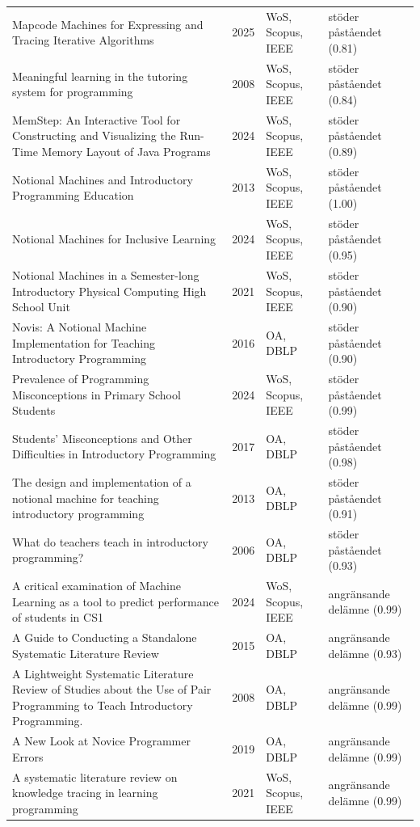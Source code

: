 \begin{longtable}{@{}%
  >{\raggedright\arraybackslash}p{}c%
  >{\raggedright\arraybackslash}p{}%
  >{\raggedright\arraybackslash}p{}@{}}
Mapcode Machines for Expressing and Tracing Iterative Algorithms & 2025 & WoS, Scopus, IEEE & stöder påståendet (0.81) \\
Meaningful learning in the tutoring system for programming & 2008 & WoS, Scopus, IEEE & stöder påståendet (0.84) \\
MemStep: An Interactive Tool for Constructing and Visualizing the Run-Time Memory Layout of Java Programs & 2024 & WoS, Scopus, IEEE & stöder påståendet (0.89) \\
Notional Machines and Introductory Programming Education & 2013 & WoS, Scopus, IEEE & stöder påståendet (1.00) \\
Notional Machines for Inclusive Learning & 2024 & WoS, Scopus, IEEE & stöder påståendet (0.95) \\
Notional Machines in a Semester-long Introductory Physical Computing High School Unit & 2021 & WoS, Scopus, IEEE & stöder påståendet (0.90) \\
Novis: A Notional Machine Implementation for Teaching Introductory Programming & 2016 & OA, DBLP & stöder påståendet (0.90) \\
Prevalence of Programming Misconceptions in Primary School Students & 2024 & WoS, Scopus, IEEE & stöder påståendet (0.99) \\
Students' Misconceptions and Other Difficulties in Introductory Programming & 2017 & OA, DBLP & stöder påståendet (0.98) \\
The design and implementation of a notional machine for teaching introductory programming & 2013 & OA, DBLP & stöder påståendet (0.91) \\
What do teachers teach in introductory programming? & 2006 & OA, DBLP & stöder påståendet (0.93) \\
A critical examination of Machine Learning as a tool to predict performance of students in CS1 & 2024 & WoS, Scopus, IEEE & angränsande delämne (0.99) \\
A Guide to Conducting a Standalone Systematic Literature Review & 2015 & OA, DBLP & angränsande delämne (0.93) \\
A Lightweight Systematic Literature Review of Studies about the Use of Pair Programming to Teach Introductory Programming. & 2008 & OA, DBLP & angränsande delämne (0.99) \\
A New Look at Novice Programmer Errors & 2019 & OA, DBLP & angränsande delämne (0.99) \\
A systematic literature review on knowledge tracing in learning programming & 2021 & WoS, Scopus, IEEE & angränsande delämne (0.99) \\

\end{longtable}
